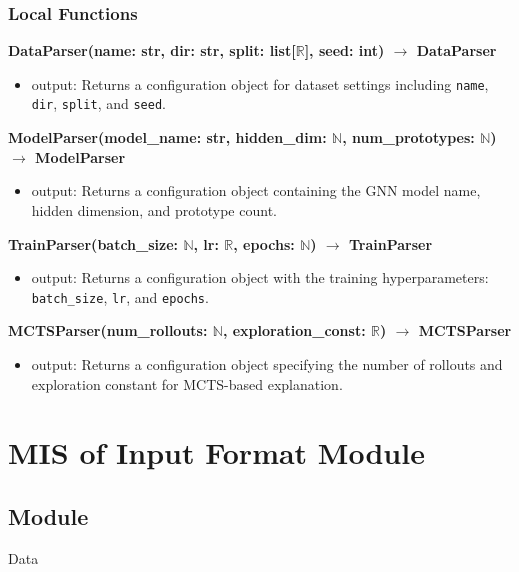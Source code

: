\documentclass[12pt, titlepage]{article}
\begin{document}
\subsubsection{Local Functions}

\noindent \textbf{DataParser(name: str, dir: str, split: list[\(\mathbb{R}\)], seed: int) \(\rightarrow\) DataParser}
\begin{itemize}
  \item output: Returns a configuration object for dataset settings including \texttt{name}, \texttt{dir}, \texttt{split}, and \texttt{seed}.
\end{itemize}

\noindent \textbf{ModelParser(model\_name: str, hidden\_dim: \(\mathbb{N}\), num\_prototypes: \(\mathbb{N}\)) \(\rightarrow\) ModelParser}
\begin{itemize}
  \item output: Returns a configuration object containing the GNN model name, hidden dimension, and prototype count.
\end{itemize}

\noindent \textbf{TrainParser(batch\_size: \(\mathbb{N}\), lr: \(\mathbb{R}\), epochs: \(\mathbb{N}\)) \(\rightarrow\) TrainParser}
\begin{itemize}
  \item output: Returns a configuration object with the training hyperparameters: \texttt{batch\_size}, \texttt{lr}, and \texttt{epochs}.
\end{itemize}

\noindent \textbf{MCTSParser(num\_rollouts: \(\mathbb{N}\), exploration\_const: \(\mathbb{R}\)) \(\rightarrow\) MCTSParser}
\begin{itemize}
  \item output: Returns a configuration object specifying the number of rollouts and exploration constant for MCTS-based explanation.
\end{itemize}

\vspace{0.5em}


\newpage


\section{MIS of Input Format Module} \label{InputFormat}

\subsection{Module}
Data
\end{document}
